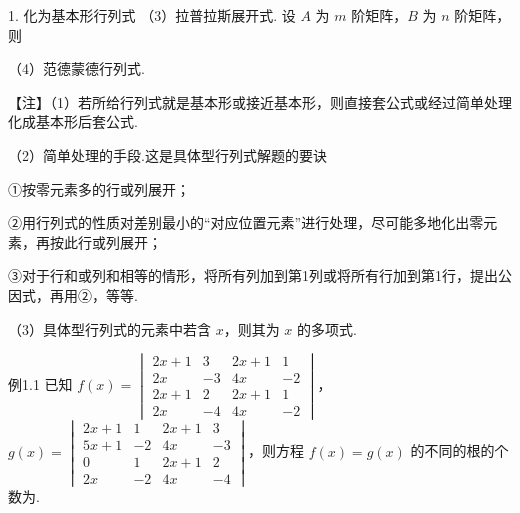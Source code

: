 \begin{fcard}{1. 化为基本形行列式}
（3）拉普拉斯展开式.
设 $A$ 为 $m$ 阶矩阵，$B$ 为 $n$ 阶矩阵，则

（4）范德蒙德行列式.
\end{fcard}

\begin{fnote}
【注】（1）若所给行列式就是基本形或接近基本形，则直接套公式或经过简单处理化成基本形后套公式.

（2）简单处理的手段.这是具体型行列式解题的要诀

①按零元素多的行或列展开；

②用行列式的性质对差别最小的“对应位置元素”进行处理，尽可能多地化出零元素，再按此行或列展开；

③对于行和或列和相等的情形，将所有列加到第1列或将所有行加到第1行，提出公因式，再用②，等等.

（3）具体型行列式的元素中若含 $x$，则其为 $x$ 的多项式.
\end{fnote}

\begin{fcard}{例1.1}
已知 $f(x)=\begin{vmatrix}2x+1&3&2x+1&1\\2x&-3&4x&-2\\2x+1&2&2x+1&1\\2x&-4&4x&-2\end{vmatrix}$，$g(x)=\begin{vmatrix}2x+1&1&2x+1&3\\5x+1&-2&4x&-3\\0&1&2x+1&2\\2x&-2&4x&-4\end{vmatrix}$，则方程 $f(x)=g(x)$ 的不同的根的个数为\underline{\hspace{2.6em}}.

\end{fcard}

